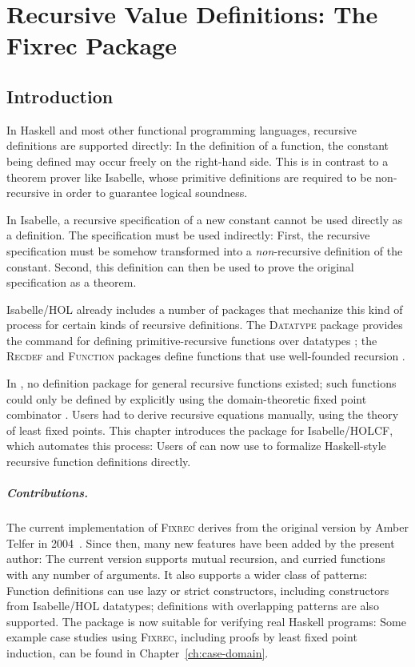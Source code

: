 \chapter{Recursive Value Definitions: The Fixrec Package}
\label{ch:fixrec}

\section{Introduction}

In Haskell and most other functional programming languages, recursive definitions are supported directly: In the definition of a function, the constant being defined may occur freely on the right-hand side. This is in contrast to a theorem prover like Isabelle, whose primitive definitions are required to be non-recursive in order to guarantee logical soundness.

In Isabelle, a recursive specification of a new constant cannot be used directly as a definition. The specification must be used indirectly: First, the recursive specification must be somehow transformed into a \emph{non}-recursive definition of the constant. Second, this definition can then be used to prove the original specification as a theorem.

Isabelle/HOL already includes a number of packages that mechanize this kind of process for certain kinds of recursive definitions. The \textsc{Datatype} package provides the  command for defining primitive-recursive functions over data\-types \cite{isabelle-tutorial}; the \textsc{Recdef} and \textsc{Function} packages define functions that use well-founded recursion \cite{Slind96recdef, Krauss10a}.

In , no definition package for general recursive functions existed; such functions could only be defined by explicitly using the domain-theoretic fixed point combinator . Users had to derive recursive equations manually, using the theory of least fixed points. This chapter introduces the {\fixrec} package for Isabelle/HOLCF, which automates this process: Users of  can now use {\fixrec} to formalize Haskell-style recursive function definitions directly.

\paragraph{Contributions.} The current implementation of \textsc{Fixrec} derives from the original version by Amber Telfer in 2004~\cite{Telfer04}. Since then, many new features have been added by the present author: The current version supports mutual recursion, and curried functions with any number of arguments. It also supports a wider class of patterns: Function definitions can use lazy or strict constructors, including constructors from Isabelle/HOL datatypes; definitions with overlapping patterns are also supported. The package is now suitable for verifying real Haskell programs: Some example case studies using \textsc{Fixrec}, including proofs by least fixed point induction, can be found in Chapter~\ref{ch:case-domain}.

